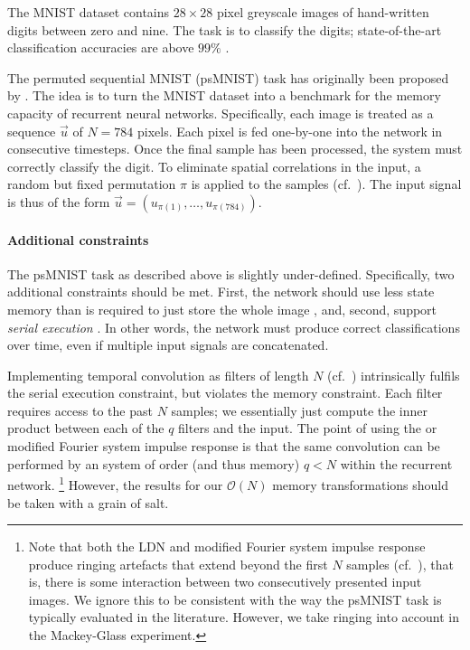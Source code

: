 The MNIST dataset \citep{lecun1998gradientbased} contains $28 \times 28$ pixel greyscale images of hand-written digits between zero and nine.
The task is to classify the digits; state-of-the-art classification accuracies are above $99\%$ \citep{baldominos2019survey}.

The permuted sequential MNIST (psMNIST) task has originally been proposed by \citet{le2015simple}.
The idea is to turn the MNIST dataset into a benchmark for the memory capacity of recurrent neural networks.
Specifically, each image is treated as a sequence $\vec u$ of $N = 784$ pixels.
Each pixel is fed one-by-one into the network in consecutive timesteps.
Once the final sample has been processed, the system must correctly classify the digit.
To eliminate spatial correlations in the input, a random but fixed permutation $\pi$ is applied to the samples (cf.~).
The input signal is thus of the form $\vec u = (u_{\pi(1)}, \ldots, u_{\pi(784)})$.

\paragraph{Additional constraints}
The psMNIST task as described above is slightly under-defined.
Specifically, two additional constraints should be met.
First, the network should use less state memory than is required to just store the whole image \citep{voelker2019lmu}, and, second, support \emph{serial execution} \citep{chandar2019nonsaturating}.
In other words, the network must produce correct classifications over time, even if multiple input signals are concatenated.

Implementing temporal convolution as \FIR filters of length $N$ (cf.~) intrinsically fulfils the serial execution constraint, but violates the memory constraint.
Each filter requires access to the past $N$ samples; we essentially just compute the inner product between each of the $q$ \FIR filters and the input.
The point of using the \LDN or modified Fourier system impulse response is that the same convolution can be performed by an \LTI system of order (and thus memory) $q < N$ within the recurrent \LRGF \LMU network.%
\footnote{Note that both the LDN and modified Fourier system impulse response produce ringing artefacts that extend beyond the first $N$ samples (cf.~), that is, there is some interaction between two consecutively presented input images.
We ignore this to be consistent with the way the psMNIST task is typically evaluated in the literature.
However, we take ringing into account in the Mackey-Glass experiment.}
However, the results for our $\mathcal{O}(N)$ memory transformations should be taken with a grain of salt.

